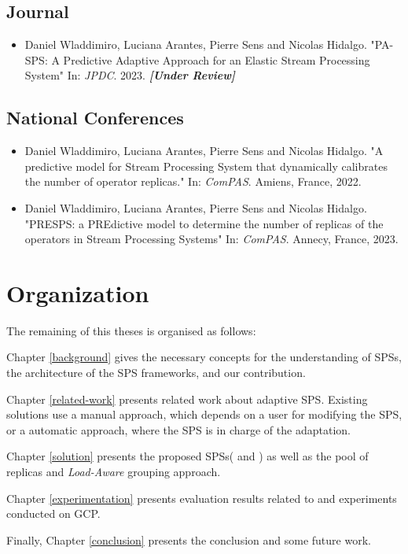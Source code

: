 \subsection{Journal}
\begin{itemize}
	\item \cite{WladdimiroJPDC} Daniel Wladdimiro, Luciana Arantes, Pierre Sens and Nicolas Hidalgo. "PA-SPS: A Predictive Adaptive Approach for an Elastic Stream Processing System" In: \textit{JPDC}. 2023. \textit{\textbf{[Under Review]}}
\end{itemize}

\subsection{National Conferences}
\begin{itemize}
	\item \cite{WladdimiroComPAS2022} Daniel Wladdimiro, Luciana Arantes, Pierre Sens and Nicolas Hidalgo. "A predictive model for Stream Processing System that dynamically calibrates the number of operator replicas." In: \textit{ComPAS}. Amiens, France, 2022.
	\item \cite{WladdimiroComPAS2023} Daniel Wladdimiro, Luciana Arantes, Pierre Sens and Nicolas Hidalgo. "PRESPS: a PREdictive model to determine the number of replicas of the operators in Stream Processing Systems" In: \textit{ComPAS}. Annecy, France, 2023.
\end{itemize}

\section{Organization}

The remaining of this theses is organised as follows:


Chapter \ref{background} gives the necessary concepts for the understanding of SPSs, the architecture of the SPS frameworks, and our contribution.

Chapter \ref{related-work} presents related work about adaptive SPS. Existing solutions use a manual approach, which depends on a user for modifying the SPS, or a automatic approach, where the SPS is in charge of the adaptation.

Chapter \ref{solution} presents the proposed SPSs(\rSPS{} and \pSPS{}) as well as the pool of replicas and \textit{Load-Aware} grouping approach.

Chapter \ref{experimentation} presents evaluation results related to \rSPS{} and \pSPS{} experiments conducted on GCP.

Finally, Chapter \ref{conclusion} presents the conclusion and some future work.